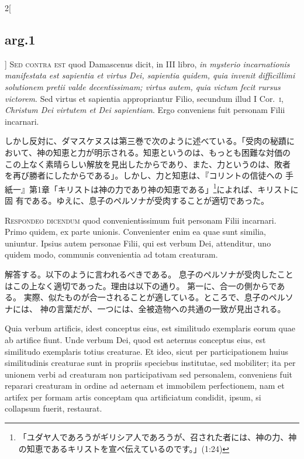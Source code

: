 \documentclass[paper=a4paper,fontsize=10pt,jafontsize=9pt,titlepage]{jlreq}
\begin{document}
\begin{paracol}{2}[\subsection{arg.1}]
{\scshape Sed contra est} quod Damascenus dicit, in III libro, {\itshape in mysterio
incarnationis manifestata est sapientia et virtus Dei, sapientia quidem,
quia invenit difficillimi solutionem pretii valde decentissimam; virtus
autem, quia victum fecit rursus victorem}. Sed virtus et sapientia
appropriantur Filio, secundum illud I Cor.~{\scshape i}, {\itshape Christum Dei virtutem et
Dei sapientiam}. Ergo conveniens fuit personam Filii incarnari.

\switchcolumn

しかし反対に、ダマスケヌスは第三巻で次のように述べている。「受肉の秘蹟に
 おいて、神の知恵と力が明示される。知恵というのは、もっとも困難な対価の
 この上なく素晴らしい解放を見出したからであり、また、力というのは、敗者
 を再び勝者にしたからである」。しかし、力と知恵は、『コリントの信徒への
 手紙一』第1章「キリストは神の力であり神の知恵である」\footnote{「ユダヤ人であろうがギリシア人であろうが、召された者には、神の力、神の知恵であるキリストを宣べ伝えているのです。」(1:24)}によれば、キリストに固
 有である。ゆえに、息子のペルソナが受肉することが適切であった。


{\scshape Respondeo dicendum} quod convenientissimum fuit personam Filii
incarnari. Primo quidem, ex parte unionis. Convenienter enim ea quae
sunt similia, uniuntur. Ipsius autem personae Filii, qui est verbum Dei,
attenditur, uno quidem modo, communis convenientia ad totam
creaturam.

\switchcolumn

解答する。以下のように言われるべきである。
息子のペルソナが受肉したことはこの上なく適切であった。理由は以下の通り。
第一に、合一の側からである。
実際、似たものが合一されることが適している。ところで、息子のペルソナには、
 神の言葉だが、一つには、全被造物への共通の一致が見出される。

\switchcolumn*

Quia verbum artificis, idest conceptus eius, est similitudo
exemplaris eorum quae ab artifice fiunt. Unde verbum Dei, quod est
aeternus conceptus eius, est similitudo exemplaris totius creaturae. Et
ideo, sicut per participationem huius similitudinis creaturae sunt in
propriis speciebus institutae, sed mobiliter; ita per unionem verbi ad
creaturam non participativam sed personalem, conveniens fuit reparari
creaturam in ordine ad aeternam et immobilem perfectionem, nam et
artifex per formam artis conceptam qua artificiatum condidit, ipsum, si
collapsum fuerit, restaurat.


\end{paracol}
\end{document}
